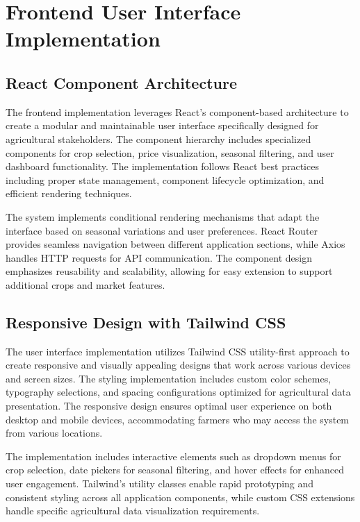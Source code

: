 \section{Frontend User Interface Implementation}

\subsection{React Component Architecture}

The frontend implementation leverages React's component-based architecture to create a modular and maintainable user interface specifically designed for agricultural stakeholders. The component hierarchy includes specialized components for crop selection, price visualization, seasonal filtering, and user dashboard functionality. The implementation follows React best practices including proper state management, component lifecycle optimization, and efficient rendering techniques.

The system implements conditional rendering mechanisms that adapt the interface based on seasonal variations and user preferences. React Router provides seamless navigation between different application sections, while Axios handles HTTP requests for API communication. The component design emphasizes reusability and scalability, allowing for easy extension to support additional crops and market features.

\subsection{Responsive Design with Tailwind CSS}

The user interface implementation utilizes Tailwind CSS utility-first approach to create responsive and visually appealing designs that work across various devices and screen sizes. The styling implementation includes custom color schemes, typography selections, and spacing configurations optimized for agricultural data presentation. The responsive design ensures optimal user experience on both desktop and mobile devices, accommodating farmers who may access the system from various locations.

The implementation includes interactive elements such as dropdown menus for crop selection, date pickers for seasonal filtering, and hover effects for enhanced user engagement. Tailwind's utility classes enable rapid prototyping and consistent styling across all application components, while custom CSS extensions handle specific agricultural data visualization requirements.

